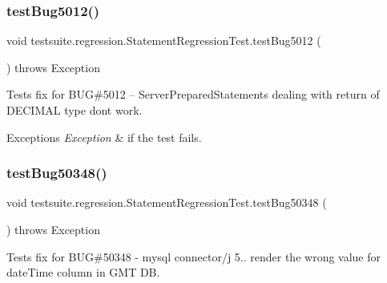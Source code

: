 \mbox{\label{classtestsuite_1_1regression_1_1_statement_regression_test_a9fbede1821be869adb354fa18fdc4686}} 
\subsubsection{\texorpdfstring{test\+Bug5012()}{testBug5012()}}
{\footnotesize\ttfamily void testsuite.\+regression.\+Statement\+Regression\+Test.\+test\+Bug5012 (\begin{DoxyParamCaption}{ }\end{DoxyParamCaption}) throws Exception}

Tests fix for B\+UG\#5012 -- Server\+Prepared\+Statements dealing with return of D\+E\+C\+I\+M\+AL type don\textquotesingle{}t work.


\begin{DoxyExceptions}{Exceptions}
{\em Exception} & if the test fails. \\
\hline
\end{DoxyExceptions}
\mbox{\label{classtestsuite_1_1regression_1_1_statement_regression_test_a2b6b5d2943bee507e1d7495e883ae9c5}} 
\subsubsection{\texorpdfstring{test\+Bug50348()}{testBug50348()}}
{\footnotesize\ttfamily void testsuite.\+regression.\+Statement\+Regression\+Test.\+test\+Bug50348 (\begin{DoxyParamCaption}{ }\end{DoxyParamCaption}) throws Exception}

Tests fix for B\+UG\#50348 -\/ mysql connector/j 5.. render the wrong value for date\+Time column in G\+MT DB.


